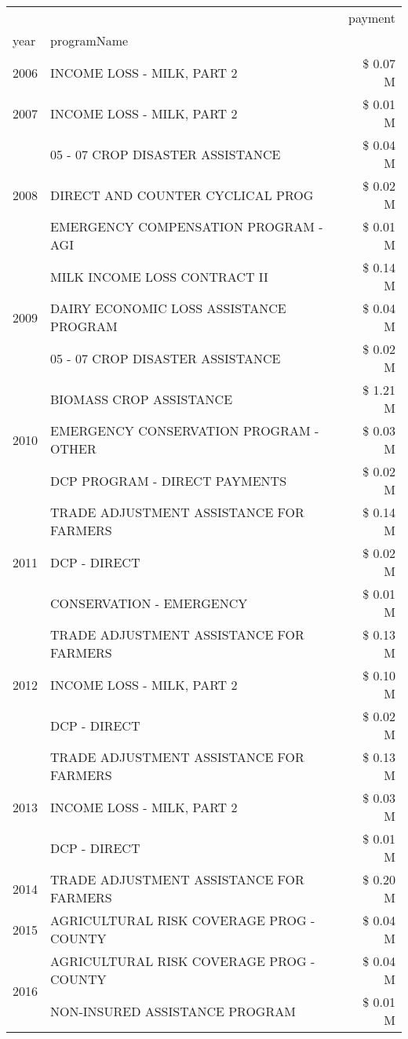 \begin{tabular}{llr}
\toprule
 &  & payment \\
year & programName &  \\
\midrule
2006 & INCOME LOSS - MILK, PART 2 & \$ 0.07 M \\
\cline{1-3}
2007 & INCOME LOSS - MILK, PART 2 & \$ 0.01 M \\
\cline{1-3}
\multirow[t]{3}{*}{2008} & 05 - 07 CROP DISASTER ASSISTANCE & \$ 0.04 M \\
 & DIRECT AND COUNTER CYCLICAL PROG & \$ 0.02 M \\
 & EMERGENCY COMPENSATION PROGRAM - AGI & \$ 0.01 M \\
\cline{1-3}
\multirow[t]{3}{*}{2009} & MILK INCOME LOSS CONTRACT II & \$ 0.14 M \\
 & DAIRY ECONOMIC LOSS ASSISTANCE PROGRAM & \$ 0.04 M \\
 & 05 - 07 CROP DISASTER ASSISTANCE & \$ 0.02 M \\
\cline{1-3}
\multirow[t]{3}{*}{2010} & BIOMASS CROP ASSISTANCE & \$ 1.21 M \\
 & EMERGENCY CONSERVATION PROGRAM - OTHER & \$ 0.03 M \\
 & DCP PROGRAM - DIRECT PAYMENTS & \$ 0.02 M \\
\cline{1-3}
\multirow[t]{3}{*}{2011} & TRADE ADJUSTMENT ASSISTANCE FOR FARMERS & \$ 0.14 M \\
 & DCP - DIRECT & \$ 0.02 M \\
 & CONSERVATION - EMERGENCY & \$ 0.01 M \\
\cline{1-3}
\multirow[t]{3}{*}{2012} & TRADE ADJUSTMENT ASSISTANCE FOR FARMERS & \$ 0.13 M \\
 & INCOME LOSS - MILK, PART 2 & \$ 0.10 M \\
 & DCP - DIRECT & \$ 0.02 M \\
\cline{1-3}
\multirow[t]{3}{*}{2013} & TRADE ADJUSTMENT ASSISTANCE FOR FARMERS & \$ 0.13 M \\
 & INCOME LOSS - MILK, PART 2 & \$ 0.03 M \\
 & DCP - DIRECT & \$ 0.01 M \\
\cline{1-3}
2014 & TRADE ADJUSTMENT ASSISTANCE FOR FARMERS & \$ 0.20 M \\
\cline{1-3}
2015 & AGRICULTURAL RISK COVERAGE PROG - COUNTY & \$ 0.04 M \\
\cline{1-3}
\multirow[t]{3}{*}{2016} & AGRICULTURAL RISK COVERAGE PROG - COUNTY & \$ 0.04 M \\
 & NON-INSURED ASSISTANCE PROGRAM & \$ 0.01 M \\

\end{tabular}
